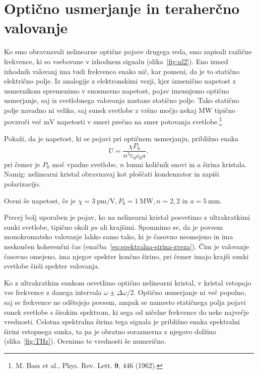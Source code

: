 \section{Optično usmerjanje in teraherčno valovanje}
Ko smo obravnavali nelinearne optične pojave drugega reda, smo zapisali
različne frekvence, ki so vsebovane v izhodnem signalu (slika~\ref{fig:nl2}). Eno izmed
izhodnih valovanj ima tudi frekvenco enako nič, kar pomeni, da je to statično električno polje. Iz analogije
z elektronskimi vezji, kjer izmenično napetost z usmernikom spremenimo v enosmerno napetost, 
pojav imenujemo optično usmerjanje, saj iz svetlobnega valovanja nastane statično polje. Tako statično 
polje navadno ni veliko, saj sunek svetlobe z vršno močjo nekaj $\si{\mega\watt}$ tipično povzroči 
več $\si{\milli\volt}$ napetosti v smeri prečno na smer potovanja svetlobe.\footnote{M. Bass
et al., Phys. Rev. Lett. $\mathbf{9}$, 446 (1962).}

\begin{definition}
Pokaži, da je napetost, ki se pojavi pri optičnem usmerjanju, približno enaka
\begin{equation}
U = \frac{\chi P_0}{n^3 \varepsilon_0 c_0 a},
\end{equation}
pri čemer je $P_0$ moč vpadne svetlobe, $n$ lomni količnik snovi in $a$ širina kristala.\\
Namig: nelinearni kristal obravnavaj kot ploščati kondenzator in zapiši polarizacijo.

Oceni še napetost, če je
$\chi = 3~\si{\pico\meter/\volt}, P_0 = 1~\si{\mega\watt}, n = 2,2$ in $a = 5~\si{\milli\metre}$. 
\end{definition}

Precej bolj uporaben je pojav, ko na nelinearni kristal posvetimo z ultrakratkimi 
sunki svetlobe, tipično okoli $\si{ps}$ ali krajšimi. Spomnimo se, da je povsem 
monokromatsko valovanje lahko samo tako, ki je časovno neomejeno in ima neskončen koherenčni čas
(enačba~\ref{eq:spektralna-sirina-zveza}). 
Čim je valovanje časovno omejeno, ima njegov spekter končno širino, pri čemer 
imajo krajši sunki svetlobe širši spekter valovanja. 

Ko z ultrakratkim sunkom osvetlimo optično 
nelinearni kristal, v kristal vstopajo vse frekvence z danega intervala $\omega \pm \Delta \omega/2$.
Optično usmerjanje ni več popolno, saj se frekvence ne odštejejo povsem, ampak se 
namesto statičnega polja pojavi sunek svetlobe s širokim spektrom, ki sega od ničelne
frekvence do neke največje vrednosti. Celotna spektralna širina tega signala je 
približno enaka spektralni širini vstopnega sunka, ta pa je obratno sorazmerna z njegovo dolžino
(slika~\ref{fig:THz}).
Ocenimo te vrednosti še numerično. 

